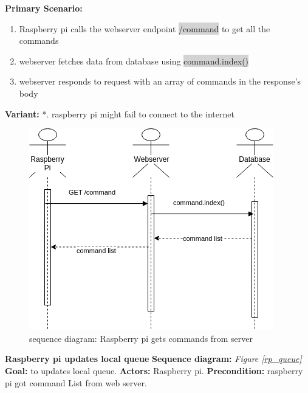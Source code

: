 \documentclass[12pt, oneside, a4paper]{book}
\newcommand{\code}[1]{{\color{red}\colorbox{lightgray}{#1}}}
\newcommand\boldcolor[1]{\textcolor{bold}{\textbf{#1}}}
\begin{document}
				\newline\textbf{Primary Scenario:}	
				\begin{enumerate}[label*=\arabic*.]
					\item Raspberry pi calls the webserver endpoint \code{/command} to get all the commands
					\item webserver fetches data from database using \code{command.index()}
					\item webserver responds to request with an array of commands in the response's body
				\end{enumerate}
				\textbf{Variant:}\newline
				\hspace*{5mm}*. raspberry pi might fail to connect to the internet \\
				\begin{figure}[H]
					\includegraphics[width=\linewidth]{img/sequece_rp_command.png}
					\caption{sequence diagram: Raspberry pi gets commands from server}					
					\label{rp_command_list}
				\end{figure}
				\newpage\hspace*{-6mm}\boldcolor{Raspberry pi updates local queue}
				\newline\textbf{Sequence diagram:} \textit{Figure \ref{rp_queue}}
				\newline\textbf{Goal:} to updates local queue.
				\newline\textbf{Actors:} Raspberry pi.
				\newline\textbf{Precondition:} raspberry pi got  command List from web server.
\end{document}
